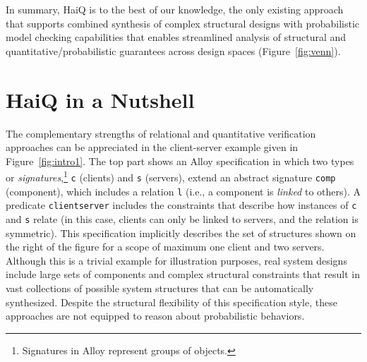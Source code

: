 \documentclass[10pt,journal,compsoc]{IEEEtran}
\begin{document}
In summary, {\sf HaiQ} is to the best of our knowledge, the only existing approach that supports combined synthesis of complex structural designs with probabilistic model checking capabilities that enables streamlined analysis of structural and quantitative/probabilistic guarantees across design spaces (Figure~\ref{fig:venn}).

\section{{\sf HaiQ} in a Nutshell}
\label{sec:overview}

The complementary strengths of relational and quantitative verification approaches can be appreciated in the client-server example given in Figure~\ref{fig:intro1}. 
The top part shows an Alloy specification in which two types or {\em signatures},\footnote{Signatures in Alloy represent groups of objects.} {\tt c} (clients) and {\tt s} (servers), extend an abstract signature {\tt comp} (component), which includes a relation {\tt l} (i.e., a component is {\em linked} to others). 
A predicate {\tt clientserver} includes the constraints that describe how instances of {\tt c} and {\tt s} relate (in this case, clients can only be linked to servers, and the relation is symmetric). 
This specification implicitly describes the set of structures shown on the right of the figure for a scope of maximum one client and two servers. 
Although this is a trivial example for illustration purposes, real system designs include large sets of components and complex structural constraints that result in vast collections of possible system structures that can be automatically synthesized. 
Despite the structural flexibility of this specification style, these approaches are not equipped to reason about probabilistic behaviors. %
\end{document}
